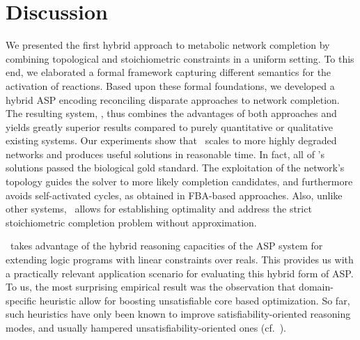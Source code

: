 
\section{Discussion}\label{sec:discussion} %

We presented the first hybrid approach to metabolic network completion
by combining topological and stoichiometric constraints in a uniform setting.
To this end,
we elaborated a formal framework capturing different semantics for the activation of reactions.
Based upon these formal foundations, we developed a hybrid ASP encoding reconciling
disparate approaches to network completion.
The resulting system, \fluto, thus combines the advantages of both approaches and 
yields greatly superior results compared to purely quantitative or qualitative existing systems.
Our experiments show that \fluto\ scales to more highly degraded networks 
and produces useful solutions in reasonable time. %
In fact, all of \fluto's solutions passed the biological gold standard.
The exploitation of the network's topology guides the solver to more likely completion candidates,
and furthermore avoids self-activated cycles, as obtained in FBA-based approaches.
Also, unlike other systems, \fluto\ allows for establishing optimality and address the strict stoichiometric completion problem without approximation.

\fluto\ takes advantage of the hybrid reasoning capacities of the ASP system \clingo{}
for extending logic programs with linear constraints over reals.
This provides us with a practically relevant application scenario for evaluating this hybrid form of ASP.
To us, the most surprising empirical result was the observation that domain-specific heuristic allow for boosting unsatisfiable core based
optimization.
So far, such heuristics have only been known to improve satisfiability-oriented reasoning modes, and usually hampered unsatisfiability-oriented ones
(cf.~\citep{gekakarosc15a}).


